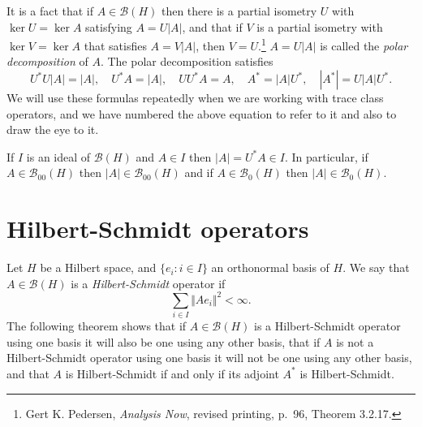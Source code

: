 \documentclass{article}
\newcommand{\norm}[1]{\Vert #1 \Vert}
\begin{document}
It is a fact that if $A \in \mathscr{B}(H)$ then there is a partial isometry $U$
with $\ker U = \ker A$ satisfying $A=U|A|$, and that if $V$ is a partial isometry with $\ker V = \ker A$ that satisfies
$A=V|A|$, then $V=U$.\footnote{Gert K. Pedersen, {\em Analysis Now}, revised printing, p.~96, Theorem 3.2.17.} $A=U|A|$ is called the {\em polar decomposition} of $A$. The polar decomposition satisfies
\begin{equation}
U^*U|A|=|A|, \quad U^*A=|A|, \quad UU^*A=A, \quad A^*=|A|U^*, \quad |A^*|=U|A|U^*.
\label{polardecomposition}
\end{equation}
We will use these formulas repeatedly when we are working with trace class operators, and we have numbered the above
equation to refer to it and also to draw the eye to it.


If $I$ is an ideal of $\mathscr{B}(H)$ and $A \in I$ then $|A|=U^*A \in I$. In particular, if $A \in \mathscr{B}_{00}(H)$ then $|A| \in \mathscr{B}_{00}(H)$ and if
$A \in \mathscr{B}_0(H)$ then $|A| \in \mathscr{B}_0(H)$.




\section{Hilbert-Schmidt operators}
Let $H$ be a Hilbert space, and $\{e_i: i \in I\}$ an orthonormal basis of $H$. We say that $A \in \mathscr{B}(H)$ is a {\em Hilbert-Schmidt}
operator if 
\[
\sum_{i \in I} \norm{Ae_i}^2 < \infty.
\]
The following theorem shows that if $A \in \mathscr{B}(H)$ is a Hilbert-Schmidt operator using one basis it will also be one using any other basis, that  if $A$ is not a Hilbert-Schmidt operator using one basis it will not be one using
any other basis, and that $A$ is Hilbert-Schmidt if and only if its adjoint $A^*$ is Hilbert-Schmidt.
\end{document}
